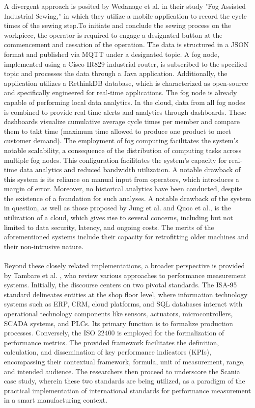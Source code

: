 A divergent approach is posited by Wedanage et al. \cite{wedanageFogAssistedIndustrial2022} in their study "Fog Assisted Industrial Sewing," in which they utilize a mobile application to record the cycle times of the sewing step.To initiate and conclude the sewing process on the workpiece, the operator is required to engage a designated button at the commencement and cessation of the operation. The data is structured in a JSON format and published via MQTT under a designated topic. A fog node, implemented using a Cisco IR829 industrial router, is subscribed to the specified topic and processes the data through a Java application. Additionally, the application utilizes a RethinkDB database, which is characterized as open-source and specifically engineered for real-time applications. The fog node is already capable of performing local data analytics. In the cloud, data from all fog nodes is combined to provide real-time alerts and analytics through dashboards. These dashboards visualize cumulative average cycle times per member and compare them to takt time (maximum time allowed to produce one product to meet customer demand). The employment of fog computing facilitates the system's notable scalability, a consequence of the distribution of computing tasks across multiple fog nodes. This configuration facilitates the system's capacity for real-time data analytics and reduced bandwidth utilization. A notable drawback of this system is its reliance on manual input from operators, which introduces a margin of error. Moreover, no historical analytics have been conducted, despite the existence of a foundation for such analyses.
A notable drawback of the system in question, as well as those proposed by Jung et al. and Quoc et al., is the utilization of a cloud, which gives rise to several concerns, including but not limited to data security, latency, and ongoing costs.
The merits of the aforementioned systems include their capacity for retrofitting older machines and their non-intrusive nature.
\\\\
Beyond these closely related implementations, a broader perspective is provided by Tambare et al. \cite{tambarePerformanceMeasurementSystem2022}, who review various approaches to performance measurement systems. Initially, the discourse centers on two pivotal standards. The ISA-95 standard delineates entities at the shop floor level, where information technology systems such as ERP, CRM, cloud platforms, and SQL databases interact with operational technology components like sensors, actuators, microcontrollers, SCADA systems, and PLCs. Its primary function is to formalize production processes. Conversely, the ISO 22400 is employed for the formalization of performance metrics. The provided framework facilitates the definition, calculation, and dissemination of key performance indicators (KPIs), encompassing their contextual framework, formula, unit of measurement, range, and intended audience. The researchers then proceed to underscore the Scania case study, wherein these two standards are being utilized, as a paradigm of the practical implementation of international standards for performance measurement in a smart manufacturing context.\\
